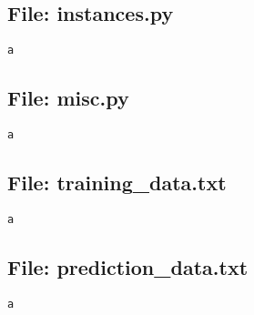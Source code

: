 \documentclass{article}
\begin{document}
\subsection*{File: instances.py}
\begin{verbatim}
a
\end{verbatim}

\subsection*{File: misc.py}
\begin{verbatim}
a
\end{verbatim}

\subsection*{File: training\_data.txt}
\begin{verbatim}
a
\end{verbatim}

\subsection*{File: prediction\_data.txt}
\begin{verbatim}
a
\end{verbatim}
\end{document}
